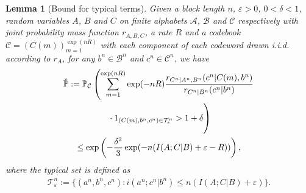 \documentclass[journal]{IEEEtran}
\newcommand{\lemmaconst}{\delta}
\newcommand{\generalpmf}{r}
\newcommand{\generalrvOne}{A}
\newcommand{\generalrvOneValue}{a}
\newcommand{\generalrvOneAlph}{\mathcal{A}}
\newcommand{\generalrvTwo}{B}
\newcommand{\generalrvTwoValue}{b}
\newcommand{\generalrvTwoAlph}{\mathcal{B}}
\newcommand{\generalrvThree}{C}
\newcommand{\generalrvThreeValue}{c}
\newcommand{\generalrvThreeAlph}{\mathcal{C}}
\newcommand{\codebookRate}{R}
\newcommand{\codebook}{\mathcal{C}}
\newcommand{\codebookWord}[1]{C(#1)}
\newcommand{\codewordIndex}{m}
\newcommand{\codebookBlocklength}{n}
\newcommand{\mutualInformationConditional}[3]{I(#1;#2|#3)}
\newcommand{\informationDensityConditional}[3]{i({#1};{#2} | {#3})}
\newcommand{\Probability}{\mathbb{P}}
\newcommand{\indicator}[1]{1_{#1}}
\newcommand{\typicalityParam}{\varepsilon}
\newcommand{\typicalSet}[2]{\mathcal{T}_{#1}^{#2}}
\newtheorem{lemma}{Lemma}
\begin{document}
\begin{lemma}[Bound for typical terms]
\label{lemma:soft-covering-two-transmitters-typical}
Given a block length $\codebookBlocklength$, $\typicalityParam > 0$, $0 < \lemmaconst < 1$, random variables $\generalrvOne$, $\generalrvTwo$ and $\generalrvThree$ on finite alphabets $\generalrvOneAlph$, $\generalrvTwoAlph$ and $\generalrvThreeAlph$ respectively with joint probability mass function $\generalpmf_{\generalrvOne, \generalrvTwo, \generalrvThree}$, a rate $\codebookRate$ and a codebook
$\codebook = (\codebookWord{\codewordIndex})_{\codewordIndex=1}^{\exp(\codebookBlocklength\codebookRate)}$ with each component of each codeword drawn i.i.d. according to $\generalpmf_\generalrvOne$, for any $\generalrvTwoValue^\codebookBlocklength \in \generalrvTwoAlph^\codebookBlocklength$ and $\generalrvThreeValue^\codebookBlocklength \in \generalrvThreeAlph^\codebookBlocklength$, we have
\begin{multline*}
\check{\Probability} :=
\Probability_{\codebook}\left(
  \sum\limits_{\codewordIndex=1}^{\exp(\codebookBlocklength\codebookRate)}
  \exp(-\codebookBlocklength\codebookRate)
  \frac{\generalpmf_{\generalrvThree^\codebookBlocklength | \generalrvOne^\codebookBlocklength, \generalrvTwo^\codebookBlocklength}(\generalrvThreeValue^\codebookBlocklength | \codebookWord{\codewordIndex}, \generalrvTwoValue^\codebookBlocklength)}
       {\generalpmf_{\generalrvThree^\codebookBlocklength | \generalrvTwo^\codebookBlocklength}(\generalrvThreeValue^\codebookBlocklength | \generalrvTwoValue^\codebookBlocklength)}
  \right.
  \\
  \left.
  \vphantom{\sum\limits_{\codewordIndex=1}^{\exp(\codebookBlocklength\codebookRate)}}
  \cdot
  \indicator{(\codebookWord{\codewordIndex}, \generalrvTwoValue^\codebookBlocklength, \generalrvThreeValue^\codebookBlocklength) \in \typicalSet{\typicalityParam}{\codebookBlocklength}}
  >
  1 + \lemmaconst
\right) \\
\leq
\exp\left(
  -\frac{\lemmaconst^2}{3} \exp(-\codebookBlocklength (\mutualInformationConditional{\generalrvOne}{\generalrvThree}{\generalrvTwo} + \typicalityParam - \codebookRate))
\right),
\end{multline*}
where the typical set is defined as
\begin{align}
\label{lemma:soft-covering-two-transmitters-typical-def}
\typicalSet{\typicalityParam}{\codebookBlocklength}
:=
\{
  (\generalrvOneValue^\codebookBlocklength, \generalrvTwoValue^\codebookBlocklength, \generalrvThreeValue^\codebookBlocklength)
  :
  \informationDensityConditional{\generalrvOneValue^\codebookBlocklength}{\generalrvThreeValue^\codebookBlocklength}{\generalrvTwoValue^\codebookBlocklength}
  \leq
  \codebookBlocklength(\mutualInformationConditional{\generalrvOne}{\generalrvThree}{\generalrvTwo}+\typicalityParam)
\}.
\end{align}


\end{lemma}
\end{document}
